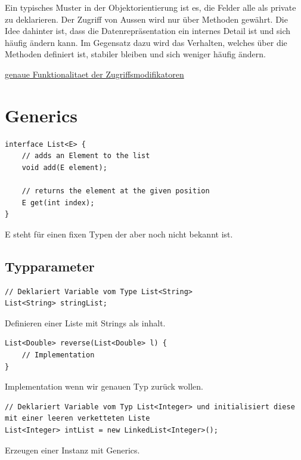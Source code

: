 \documentclass[12pt]{article}
\begin{document}
    Ein typisches Muster in der Objektorientierung ist es, die Felder alle als private zu deklarieren. Der Zugriff von Aussen wird nur über Methoden gewährt. 
    Die Idee dahinter ist, dass die Datenrepräsentation ein internes Detail ist und sich häufig ändern kann. 
    Im Gegensatz dazu wird das Verhalten, welches über die Methoden definiert ist, stabiler bleiben und sich weniger häufig ändern.

    \href{https://unibas.cloud.panopto.eu/Panopto/Pages/Viewer.aspx?id=bacffede-fd03-4d96-b1fb-af4e0095dfcd&start=6.708527}{genaue Funktionalitaet der Zugriffsmodifikatoren}

    \section*{Generics}

    \begin{lstlisting}
interface List<E> {
    // adds an Element to the list
    void add(E element);

    // returns the element at the given position
    E get(int index);
}
    \end{lstlisting}

    E steht für einen fixen Typen der aber noch nicht bekannt ist.

    \subsection*{Typparameter}

    \begin{lstlisting}
// Deklariert Variable vom Type List<String>
List<String> stringList;
    \end{lstlisting}

    Definieren einer Liste mit Strings als inhalt. 

    \begin{lstlisting}
List<Double> reverse(List<Double> l) {
    // Implementation
}
    \end{lstlisting}

    Implementation wenn wir genauen Typ zurück wollen. 

    \begin{lstlisting}
// Deklariert Variable vom Typ List<Integer> und initialisiert diese mit einer leeren verketteten Liste
List<Integer> intList = new LinkedList<Integer>();
    \end{lstlisting}

    Erzeugen einer Instanz mit Generics.
\end{document}
